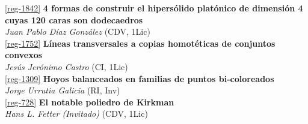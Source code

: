 \begin{multicols}{2}
\noindent  \ref{reg-1842}  {\bfseries 4 formas de construir el hipers\'olido plat\'onico de dimensi\'on 4 cuyas 120 caras son dodecaedros}\\
{\slshape  Juan Pablo D\'iaz Gonz\'alez} {\footnotesize (CDV, 1Lic)}\\

\noindent  \ref{reg-1752}  {\bfseries L\'ineas transversales a copias homot\'eticas de conjuntos convexos}\\
{\slshape  Jes\'us  Jer\'onimo Castro} {\footnotesize (CI, 1Lic)}\\

\noindent  \ref{reg-1309}  {\bfseries Hoyos balanceados en familias de puntos bi-coloreados}\\
{\slshape  Jorge  Urrutia Galicia} {\footnotesize (RI, Inv)}\\

\noindent  \ref{reg-728}  {\bfseries El notable poliedro de Kirkman}\\
{\slshape  Hans L. Fetter (Invitado)} {\footnotesize (CDV, 1Lic)}\\

\end{multicols}
